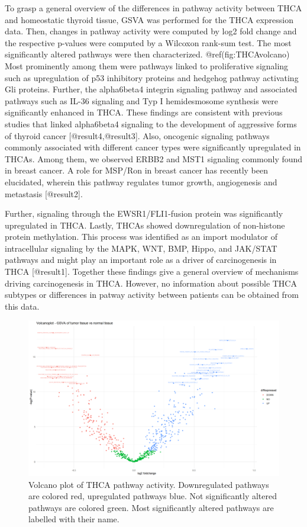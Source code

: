 \documentclass[
]{article}
\begin{document}
To grasp a general overview of the differences in pathway activity
between THCA and homeostatic thyroid tissue, GSVA was performed for the
THCA expression data. Then, changes in pathway activity were computed by
log2 fold change and the respective p-values were computed by a Wilcoxon
rank-sum test. The most significantly altered pathways were then
characterized. @ref(fig:THCAvolcano) Most prominently among them were
pathways linked to proliferative signaling such as upregulation of p53
inhibitory proteins and hedgehog pathway activating Gli proteins.
Further, the alpha6beta4 integrin signaling pathway and associated
pathways such as IL-36 signaling and Typ I hemidesmosome synthesis were
significantly enhanced in THCA. These findings are consistent with
previous studies that linked alpha6beta4 signaling to the development of
aggressive forms of thyroid cancer {[}@result4,@result3{]}. Also,
oncogenic signaling pathways commonly associated with different cancer
types were significantly upregulated in THCAs. Among them, we observed
ERBB2 and MST1 signaling commonly found in breast cancer. A role for
MSP/Ron in breast cancer has recently been elucidated, wherein this
pathway regulates tumor growth, angiogenesis and metastasis
{[}@result2{]}.

Further, signaling through the EWSR1/FLI1-fusion protein was
significantly upregulated in THCA. Lastly, THCAs showed downregulation
of non-histone protein methylation. This process was identified as an
import modulator of intracellular signaling by the MAPK, WNT, BMP,
Hippo, and JAK/STAT pathways and might play an important role as a
driver of carcinogenesis in THCA {[}@result1{]}. Together these findings
give a general overview of mechanisms driving carcinogenesis in THCA.
However, no information about possible THCA subtypes or differences in
patway activity between patients can be obtained from this data.

\begin{figure}

{\centering \includegraphics[width=1\linewidth]{figures/Volcanoplot THCA GSVA data} 

}

\caption{Volcano plot of THCA pathway activity. Downregulated pathways are colored red, upregulated pathways blue. Not significantly altered pathways are colored green. Most significantly altered pathways are labelled with their name.}\label{fig:THCAvolcano}
\end{figure}
\end{document}
